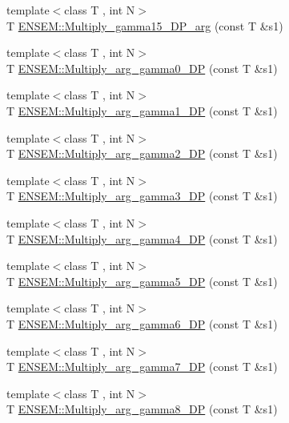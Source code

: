 \begin{DoxyCompactItemize}
\item 
{\footnotesize template$<$class T , int N$>$ }\\T \mbox{\hyperlink{namespaceENSEM_a2604fc2158319ad3521cb11baf9f4827}{E\+N\+S\+E\+M\+::\+Multiply\+\_\+gamma15\+\_\+\+D\+P\+\_\+arg}} (const T \&s1)
\item 
{\footnotesize template$<$class T , int N$>$ }\\T \mbox{\hyperlink{namespaceENSEM_a728cdffad1181ba8d9631643b0240571}{E\+N\+S\+E\+M\+::\+Multiply\+\_\+arg\+\_\+gamma0\+\_\+\+DP}} (const T \&s1)
\item 
{\footnotesize template$<$class T , int N$>$ }\\T \mbox{\hyperlink{namespaceENSEM_abafa173ea01d6b8ed3f4a6053171d931}{E\+N\+S\+E\+M\+::\+Multiply\+\_\+arg\+\_\+gamma1\+\_\+\+DP}} (const T \&s1)
\item 
{\footnotesize template$<$class T , int N$>$ }\\T \mbox{\hyperlink{namespaceENSEM_acd7a14ccd822e91b8aed95356a6bf37c}{E\+N\+S\+E\+M\+::\+Multiply\+\_\+arg\+\_\+gamma2\+\_\+\+DP}} (const T \&s1)
\item 
{\footnotesize template$<$class T , int N$>$ }\\T \mbox{\hyperlink{namespaceENSEM_a1cd29e4091ddccc63172a39cb823d36a}{E\+N\+S\+E\+M\+::\+Multiply\+\_\+arg\+\_\+gamma3\+\_\+\+DP}} (const T \&s1)
\item 
{\footnotesize template$<$class T , int N$>$ }\\T \mbox{\hyperlink{namespaceENSEM_aab91417895cd5506b2fb592080159714}{E\+N\+S\+E\+M\+::\+Multiply\+\_\+arg\+\_\+gamma4\+\_\+\+DP}} (const T \&s1)
\item 
{\footnotesize template$<$class T , int N$>$ }\\T \mbox{\hyperlink{namespaceENSEM_a4fa6e39200a0df1fd7fa5731efe9641e}{E\+N\+S\+E\+M\+::\+Multiply\+\_\+arg\+\_\+gamma5\+\_\+\+DP}} (const T \&s1)
\item 
{\footnotesize template$<$class T , int N$>$ }\\T \mbox{\hyperlink{namespaceENSEM_ae1c5c19c0bc38e6a6ab6ef8c654af325}{E\+N\+S\+E\+M\+::\+Multiply\+\_\+arg\+\_\+gamma6\+\_\+\+DP}} (const T \&s1)
\item 
{\footnotesize template$<$class T , int N$>$ }\\T \mbox{\hyperlink{namespaceENSEM_af8d5b6d451f6dbfcb8267d716e45f849}{E\+N\+S\+E\+M\+::\+Multiply\+\_\+arg\+\_\+gamma7\+\_\+\+DP}} (const T \&s1)
\item 
{\footnotesize template$<$class T , int N$>$ }\\T \mbox{\hyperlink{namespaceENSEM_acf415cfb4423b511f1bf7c4531c24eda}{E\+N\+S\+E\+M\+::\+Multiply\+\_\+arg\+\_\+gamma8\+\_\+\+DP}} (const T \&s1)

\end{DoxyCompactItemize}
